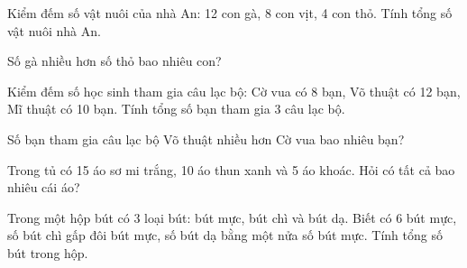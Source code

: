 \begin{ex} %
Kiểm đếm số vật nuôi của nhà An: 12 con gà, 8 con vịt, 4 con thỏ. Tính tổng số vật nuôi nhà An.
\end{ex}

\begin{ex} %
Số gà nhiều hơn số thỏ bao nhiêu con?
\end{ex}

\begin{ex} %
Kiểm đếm số học sinh tham gia câu lạc bộ: Cờ vua có 8 bạn, Võ thuật có 12 bạn, Mĩ thuật có 10 bạn. Tính tổng số bạn tham gia 3 câu lạc bộ.
\end{ex}

\begin{ex} %
Số bạn tham gia câu lạc bộ Võ thuật nhiều hơn Cờ vua bao nhiêu bạn?
\end{ex}

\begin{ex} %
Trong tủ có 15 áo sơ mi trắng, 10 áo thun xanh và 5 áo khoác. Hỏi có tất cả bao nhiêu cái áo?
\end{ex}

\begin{ex} %
Trong một hộp bút có 3 loại bút: bút mực, bút chì và bút dạ. Biết có 6 bút mực, số bút chì gấp đôi bút mực, số bút dạ bằng một nửa số bút mực. Tính tổng số bút trong hộp.
\end{ex}
